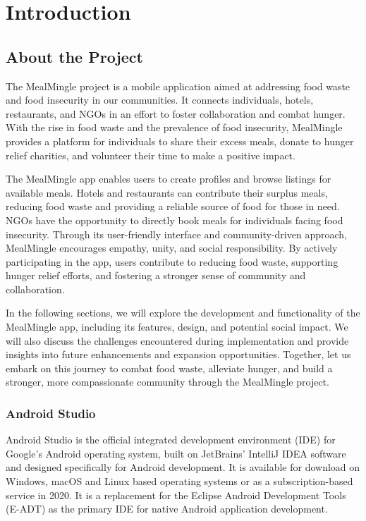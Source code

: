 \chapter{Introduction}
\section{About the Project}
The MealMingle project is a mobile application aimed at addressing food waste and food insecurity in our communities. It connects individuals, hotels, restaurants, and NGOs in an effort to foster collaboration and combat hunger. With the rise in food waste and the prevalence of food insecurity, MealMingle provides a platform for individuals to share their excess meals, donate to hunger relief charities, and volunteer their time to make a positive impact.

The MealMingle app enables users to create profiles and browse listings for available meals. Hotels and restaurants can contribute their surplus meals, reducing food waste and providing a reliable source of food for those in need. NGOs have the opportunity to directly book meals for individuals facing food insecurity. Through its user-friendly interface and community-driven approach, MealMingle encourages empathy, unity, and social responsibility. By actively participating in the app, users contribute to reducing food waste, supporting hunger relief efforts, and fostering a stronger sense of community and collaboration.

In the following sections, we will explore the development and functionality of the MealMingle app, including its features, design, and potential social impact. We will also discuss the challenges encountered during implementation and provide insights into future enhancements and expansion opportunities. Together, let us embark on this journey to combat food waste, alleviate hunger, and build a stronger, more compassionate community through the MealMingle project.
\subsection{Android Studio}
Android Studio is the official integrated development environment (IDE) for Google's Android operating system, built on JetBrains' IntelliJ IDEA software and designed specifically for Android development. It is available for download on Windows, macOS and Linux based operating systems or as a subscription-based service in 2020. It is a replacement for the Eclipse Android Development Tools (E-ADT) as the primary IDE for native Android application development. 

